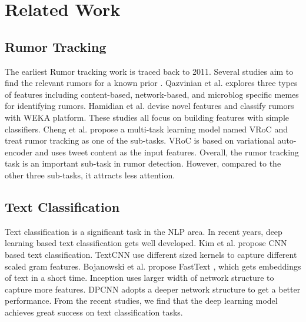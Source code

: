 \section{Related Work}
\label{sec:related}

\subsection{Rumor Tracking}
\label{sec:rumortracking}
The earliest Rumor tracking work is traced back to 2011. Several studies aim to find the relevant rumors for a known prior \cite{DBLP:journals/csur/ZubiagaABLP18}. Qazvinian et al. \cite{DBLP:conf/emnlp/QazvinianRRM11} explores three types of features including content-based, network-based, and microblog specific memes for identifying rumors. Hamidian et al. \cite{DBLP:journals/corr/abs-1912-08926} devise novel features and classify rumors with WEKA platform. These studies all focus on building features with simple classifiers. Cheng et al. \cite{DBLP:conf/www/ChengNB20} propose a multi-task learning model named VRoC and treat rumor tracking as one of the sub-tasks. VRoC is based on variational auto-encoder and uses tweet content as the input features. Overall, the rumor tracking task is an important sub-task in rumor detection. However, compared to the other three sub-tasks, it attracts less attention.

\subsection{Text Classification}
\label{sec:textclassification}
Text classification is a significant task in the NLP area. In recent years, deep learning based text classification gets well developed. Kim et al. \cite{DBLP:conf/emnlp/Kim14} propose CNN based text classification. TextCNN use different sized kernels to capture different scaled gram features. Bojanowski et al. propose FastText  \cite{DBLP:journals/tacl/BojanowskiGJM17}, which gets embeddings of text in a short time. Inception \cite{DBLP:journals/corr/SzegedyLJSRAEVR14} uses larger width of network structure to capture more features. DPCNN \cite{DBLP:conf/acl/JohnsonZ17} adopts a deeper network structure to get a better performance. From the recent studies, we find that the deep learning model achieves great success on text classification tasks.
